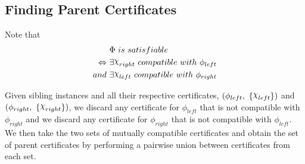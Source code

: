 \subsection*{Finding Parent Certificates}

Note that
\begin{align*}
    & \Phi~ is~ satisfiable \\
    \Leftrightarrow~ & \exists \rchi_{right}~ compatible~ with~ \phi_{left} \\
    and~ & \exists \rchi_{left}~ compatible~ with~ \phi_{right}
\end{align*}

Given sibling instances and all their respective certificates, $(\phi_{left},~ \{ \rchi_{left} \})$ and $(\phi_{right},~ \{ \rchi_{right} \})$, we discard any certificate for $\phi_{left}$ that is not compatible with $\phi_{right}$ and we discard any certificate for $\phi_{right}$ that is not compatible with $\phi_{left}$.
We then take the two sets of mutually compatible certificates and obtain the set of parent certificates by performing a pairwise union between certificates from each set.
